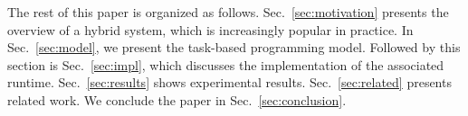 
The rest of this paper is organized as follows.
Sec.~\ref{sec:motivation} presents the overview of a hybrid system, which is increasingly popular in practice.
In Sec.~\ref{sec:model}, we present the task-based programming model.
Followed by this section is Sec.~\ref{sec:impl}, which discusses the implementation of the associated runtime.
Sec.~\ref{sec:results} shows experimental results.
Sec.~\ref{sec:related} presents related work.
We conclude the paper in Sec.~\ref{sec:conclusion}.
